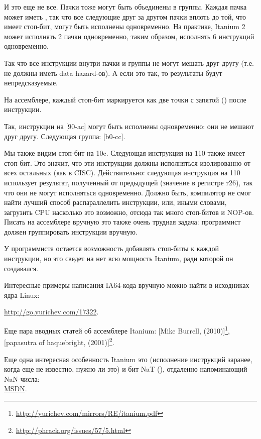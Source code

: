 И это еще не все. Пачки тоже могут быть объединены в группы.
Каждая пачка может иметь , так что все следующие друг за другом пачки вплоть до той,
что имеет стоп-бит, могут быть исполнены одновременно.
На практике, Itanium 2 может исполнять 2 пачки одновременно, таким образом, исполнять
6 инструкций одновременно.

Так что все инструкции внутри пачки и группы не могут мешать друг другу (т.е. не должны
иметь data hazard-ов).
А если это так, то результаты будут непредсказуемые.

На ассемблере, каждый стоп-бит маркируется как две точки с запятой (\TT{;;}) после инструкции.

Так, инструкции на [90-ac] могут быть исполнены одновременно: они не мешают друг другу. Следующая группа: [b0-cc].

Мы также видим стоп-бит на 10c.
Следующая инструкция на 110 также имеет стоп-бит.
Это значит, что эти инструкции должны исполняться изолированно от всех остальных (как в \ac{CISC}).
Действительно: следующая инструкция на 110 использует результат, полученный от предыдущей (значение
в регистре r26), так что они не могут исполняться одновременно.
Должно быть, компилятор не смог найти лучший способ распараллелить инструкции, или, иными
словами, загрузить \ac{CPU} насколько это возможно, отсюда так много стоп-битов и \ac{NOP}-ов.
Писать на ассемблере вручную это также очень трудная задача: программист должен группировать
инструкции вручную.

У программиста остается возможность добавлять стоп-биты к каждой инструкции, но это
сведет на нет всю мощность Itanium, ради которой он создавался.

Интересные примеры написания \ac{IA64}-кода вручную можно найти в исходниках ядра Linux:

\url{http://go.yurichev.com/17322}.

Еще пара вводных статей об ассемблере Itanium:
[Mike Burrell,  (2010)]\footnote{\AlsoAvailableAs \url{http://yurichev.com/mirrors/RE/itanium.pdf}},
[papasutra of haquebright,  (2001)]\footnote{\AlsoAvailableAs \url{http://phrack.org/issues/57/5.html}}.

Еще одна интересная особенность Itanium это  (исполнение инструкций
заранее, когда еще не известно, нужно ли это) и бит NaT (), отдаленно напоминающий
\gls{NaN}-числа: \\
\href{http://go.yurichev.com/17323}{MSDN}.

